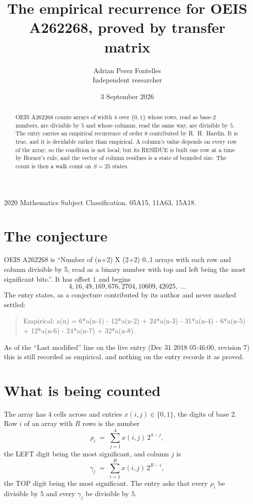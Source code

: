 \documentclass[11pt,a4paper]{article}
\title{The empirical recurrence for OEIS A262268, proved by transfer matrix}
\author{Adrian Perez Fontelles\\ \small Independent researcher}
\date{3 September 2026}
\theoremstyle{plain}
\theoremstyle{definition}
\begin{document}
\maketitle

\begin{abstract}
OEIS A262268 counts arrays of width $4$ over $\{0,1\}$ whose rows, read as base-$2$
numbers, are divisible by $5$ and whose columns, read the same way, are divisible by
$5$. The entry carries an empirical recurrence of order $8$ contributed by
R.~H.~Hardin. It is true, and it is decidable rather than empirical. A column's value depends on
every row of the array, so the condition is not local; but its RESIDUE is built one row at a
time by Horner's rule, and the vector of column residues is a state of bounded size. The count
is then a walk count on $S=25$ states.
\end{abstract}

\noindent\small 2020 Mathematics Subject Classification. 05A15, 11A63, 15A18.\normalsize

\section{The conjecture}

OEIS A262268 is ``Number of (n+2) X (2+2) 0..1 arrays with each row and column divisible by 5, read as a binary number with top and left being the most significant bits.''. It has offset $1$ and begins
\[
4, 16, 49, 169, 676, 2704, 10609, 42025,\ \dots
\]
The entry states, as a conjecture contributed by its author and never marked settled:
\begin{quote}
Empirical: a(n) = 6*a(n-1) - 12*a(n-2) + 24*a(n-3) - 31*a(n-4) - 6*a(n-5) + 12*a(n-6) - 24*a(n-7) + 32*a(n-8).
\end{quote}
As of the ``Last modified'' line on the live entry (Dec 31 2018 05:46:00, revision 7) this is still
recorded as empirical, and nothing on the entry records it as proved.

\section{What is being counted}

The array has $4$ cells across and entries $x(i,j)\in\{0,1\}$, the digits of
base $2$. Row $i$ of an array with $R$ rows is the number
\[
\rho_i\;=\;\sum_{j=1}^{4}x(i,j)\,2^{4-j} ,
\]
the LEFT digit being the most significant, and column $j$ is
\[
\gamma_j\;=\;\sum_{i=1}^{R}x(i,j)\,2^{R-i} ,
\]
the TOP digit being the most significant. The entry asks that every $\rho_i$ be divisible by
$5$ and every $\gamma_j$ be divisible by $5$.
\end{document}
